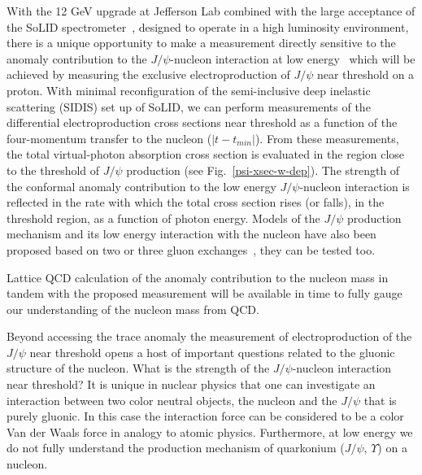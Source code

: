 \documentclass[12pt]{article}
\begin{document}
With the 12 GeV upgrade at Jefferson Lab combined with the large acceptance of the SoLID  spectrometer~\cite{pCDR}, designed to operate in a high luminosity environment,  there is a unique opportunity to make a measurement directly sensitive to the anomaly contribution to the $J/\psi$-nucleon interaction at low energy~ \cite{Kharzeev:1995ij,Kharzeev:1998bz} which will be achieved by measuring the exclusive electroproduction of $J/\psi$ near threshold on a proton. With minimal reconfiguration of the semi-inclusive deep inelastic scattering (SIDIS) set up of SoLID, we can perform measurements of the differential electroproduction cross sections near threshold as a function of the four-momentum transfer to the nucleon ($|t-t_{min}|$). From these measurements, the total virtual-photon absorption cross section is evaluated in the region close to the threshold of $J/\psi$ production (see Fig.~\ref{psi-xsec-w-dep}). The strength of the conformal anomaly contribution to the low energy $J/\psi$-nucleon interaction is reflected in the rate with which the total cross section rises (or falls), in the threshold region, as a function of photon energy. Models of the $J/\psi$ production mechanism and its low energy interaction with the nucleon have also been proposed based on two or three gluon exchanges~\cite{Brodsky:2000zc}, they can be tested too.
% 

Lattice QCD calculation of the anomaly contribution to the nucleon mass in tandem with the proposed measurement will be available in time to fully gauge our understanding of the nucleon mass from QCD.

Beyond accessing the trace anomaly the measurement of electroproduction of the $J/\psi$ near threshold opens a host of important questions related to the gluonic structure of the nucleon. What is the strength of the  $J/\psi$-nucleon  interaction near threshold? It is unique in nuclear physics that one can investigate an interaction between two color neutral objects, the nucleon and the $J/\psi$ that is purely gluonic.  In this case the interaction force can be considered to be a color Van der Waals force in analogy to atomic physics. Furthermore, at low energy we do not fully understand the production mechanism of quarkonium ($J/\psi$, $\Upsilon$) on a nucleon.
\end{document}
